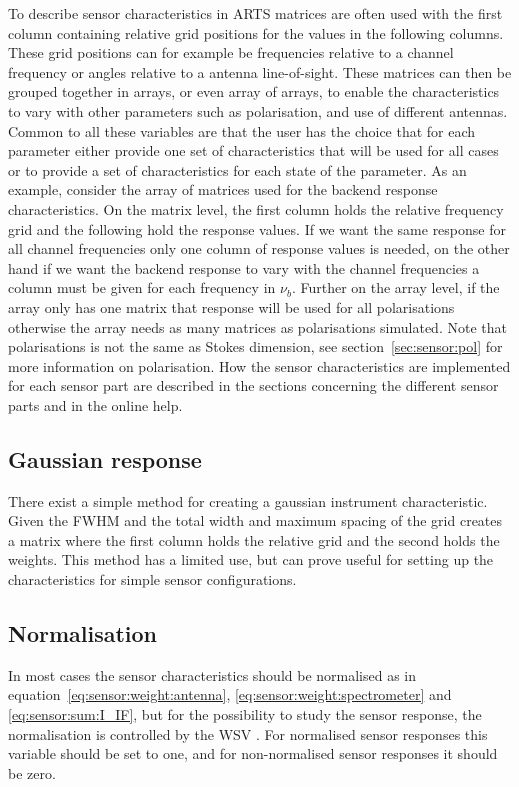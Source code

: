 To describe sensor characteristics in ARTS matrices are often used with the first column containing relative grid positions for the values in the following columns. These grid positions can for example be frequencies relative to a channel frequency or angles relative to a antenna line-of-sight. These matrices can then be grouped together in arrays, or even array of arrays, to enable the characteristics to vary with other parameters such as polarisation, and use of different antennas. Common to all these variables are that the user has the choice that for each parameter either provide one set of characteristics that will be used for all cases or to provide a set of characteristics for each state of the parameter. As an example, consider the array of matrices used for the backend response characteristics. On the matrix level, the first column holds the relative frequency grid and the following hold the response values. If we want the same response for all channel frequencies only one column of response values is needed, on the other hand if we want the backend response to vary with the channel frequencies a column must be given for each frequency in $\nu_b$. Further on the array level, if the array only has one matrix that response will be used for all polarisations otherwise the array needs as many matrices as polarisations simulated. Note that polarisations is not the same as Stokes dimension, see section~\ref{sec:sensor:pol} for more information on polarisation.
How the sensor characteristics are implemented for each sensor part are described in the 
sections concerning the different sensor parts and in the online help.

\subsection{Gaussian response}
\label{sec:sensor:instchar:gauss}
There exist a simple method for creating a gaussian instrument characteristic. Given the FWHM and the total width and maximum spacing of the grid  creates a matrix where the first column holds the relative grid and the second holds the weights. This method has a limited use, but can prove useful for setting up the characteristics for simple sensor configurations.

\subsection{Normalisation}
In most cases the sensor characteristics should be normalised as in equation~\ref{eq:sensor:weight:antenna}, \ref{eq:sensor:weight:spectrometer} and \ref{eq:sensor:sum:I_IF}, but for the possibility to study the sensor response, the normalisation is controlled by the WSV . For normalised sensor responses this variable should be set to one, and for non-normalised sensor responses it should be zero.

